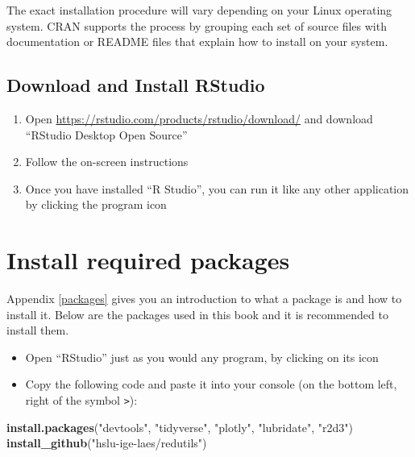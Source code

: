 \documentclass[
]{book}
\newenvironment{Shaded}{\begin{snugshade}}{\end{snugshade}}
\newcommand{\KeywordTok}[1]{\textcolor[rgb]{0.13,0.29,0.53}{\textbf{#1}}}
\newcommand{\NormalTok}[1]{#1}
\newcommand{\StringTok}[1]{\textcolor[rgb]{0.31,0.60,0.02}{#1}}
\providecommand{\tightlist}{%
  \setlength{\itemsep}{0pt}\setlength{\parskip}{0pt}}
\let\oldShaded\Shaded
\let\endoldShaded\endShaded
\renewenvironment{Shaded}{\footnotesize\oldShaded}{\endoldShaded}
\begin{document}
The exact installation procedure will vary depending on your Linux operating system. CRAN supports the process by grouping each set of source files with documentation or README files that explain how to install on your system.

\hypertarget{download-and-install-rstudio}{%
\subsection{Download and Install RStudio}\label{download-and-install-rstudio}}

\begin{enumerate}
\def\labelenumi{\arabic{enumi}.}
\tightlist
\item
  Open \url{https://rstudio.com/products/rstudio/download/} and download ``RStudio Desktop Open Source''
\item
  Follow the on-screen instructions
\item
  Once you have installed ``R Studio'', you can run it like any other application by clicking the program icon
\end{enumerate}

\hypertarget{installationPackages}{%
\section{Install required packages}\label{installationPackages}}

Appendix \ref{packages} gives you an introduction to what a package is and how to install it. Below are the packages used in this book and it is recommended to install them.

\begin{itemize}
\item
  Open ``RStudio'' just as you would any program, by clicking on its icon
\item
  Copy the following code and paste it into your console (on the bottom left, right of the symbol \texttt{\textgreater{}}):
\end{itemize}

\begin{Shaded}
\begin{Highlighting}[]
\KeywordTok{install.packages}\NormalTok{(}\StringTok{"devtools"}\NormalTok{, }\StringTok{"tidyverse"}\NormalTok{, }\StringTok{"plotly"}\NormalTok{, }\StringTok{"lubridate"}\NormalTok{, }\StringTok{"r2d3"}\NormalTok{)}
\KeywordTok{install_github}\NormalTok{(}\StringTok{"hslu-ige-laes/redutils"}\NormalTok{)}
\end{Highlighting}
\end{Shaded}
\end{document}
